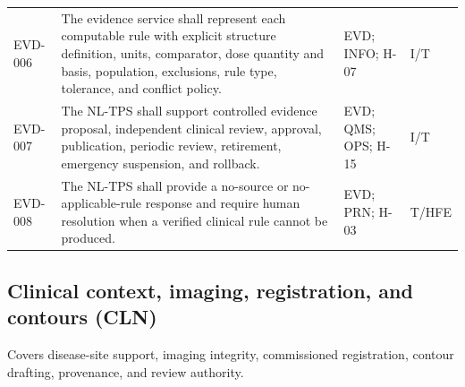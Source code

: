 \documentclass[11pt,letterpaper]{article}
\begin{document}
\begin{small}
\begin{longtable}{@{}L{0.0806\textwidth}L{0.5386\textwidth}L{0.1868\textwidth}L{0.1140\textwidth}@{}}
\addlinespace[2pt]
EVD-006 & The evidence service shall represent each computable rule with explicit structure definition, units, comparator, dose quantity and basis, population, exclusions, rule type, tolerance, and conflict policy. & EVD; INFO; H-07 & I\slash\allowbreak{}T \\
\addlinespace[2pt]
EVD-007 & The NL-TPS shall support controlled evidence proposal, independent clinical review, approval, publication, periodic review, retirement, emergency suspension, and rollback. & EVD; QMS; OPS; H-15 & I\slash\allowbreak{}T \\
\addlinespace[2pt]
EVD-008 & The NL-TPS shall provide a no-source or no-applicable-rule response and require human resolution when a verified clinical rule cannot be produced. & EVD; PRN; H-03 & T\slash\allowbreak{}HFE \\
\end{longtable}
\end{small}

\subsection{Clinical context, imaging, registration, and contours (CLN)}

Covers disease-site support, imaging integrity, commissioned registration, contour drafting, provenance, and review authority.
\end{document}
